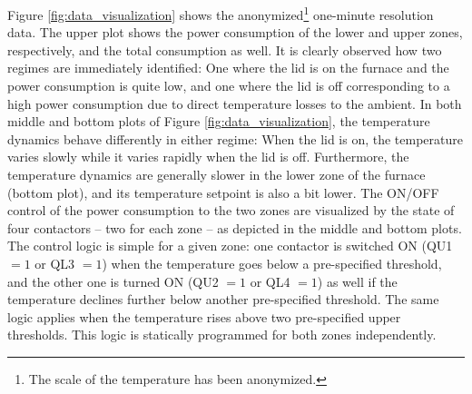 \documentclass[conference]{IEEEtran}
\begin{document}
Figure \ref{fig:data_visualization} shows the anonymized\footnote{The scale of the temperature has been anonymized.} one-minute resolution data. The upper plot shows the power consumption of the lower and upper zones, respectively, and the total consumption as well. It is clearly observed how two regimes are immediately identified: One where the lid is on the furnace and the power consumption is quite low, and one where the lid is off corresponding to a high power consumption due to direct temperature losses to the ambient. In both middle and bottom plots of Figure \ref{fig:data_visualization}, the temperature dynamics behave differently in either regime: When the lid is on, the temperature varies slowly while it varies rapidly when the lid is off. Furthermore, the temperature dynamics are generally slower in the lower zone of the furnace (bottom plot), and its temperature setpoint is also a bit lower. The ON/OFF control of the power consumption to the two zones are visualized by the state of four contactors -- two for each zone -- as depicted in the middle and bottom plots. The control logic is simple for a given zone: one contactor is switched ON (QU1 $=1$ or QL3 $=1$) when the temperature goes below a pre-specified threshold, and the other one is turned ON (QU2 $=1$ or QL4 $=1$) as well if the temperature declines further below another pre-specified threshold. The same logic applies when the temperature rises above two pre-specified upper thresholds. This logic is statically programmed for both zones independently.
\end{document}
